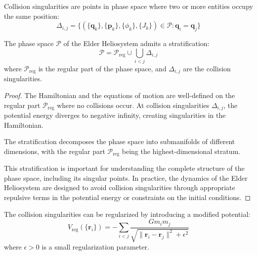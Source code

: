 \begin{definition}
Collision singularities are points in phase space where two or more entities occupy the same position:
\begin{equation}
\Delta_{i,j} = \{(\{\mathbf{q}_k\}, \{\mathbf{p}_k\}, \{\phi_k\}, \{J_k\}) \in \mathcal{P} : \mathbf{q}_i = \mathbf{q}_j\}
\end{equation}
\end{definition}

\begin{theorem}
The phase space $\mathcal{P}$ of the Elder Heliosystem admits a stratification:
\begin{equation}
\mathcal{P} = \mathcal{P}_{\text{reg}} \cup \bigcup_{i < j} \Delta_{i,j}
\end{equation}
where $\mathcal{P}_{\text{reg}}$ is the regular part of the phase space, and $\Delta_{i,j}$ are the collision singularities.
\end{theorem}

\begin{proof}
The Hamiltonian and the equations of motion are well-defined on the regular part $\mathcal{P}_{\text{reg}}$ where no collisions occur. At collision singularities $\Delta_{i,j}$, the potential energy diverges to negative infinity, creating singularities in the Hamiltonian.

The stratification decomposes the phase space into submanifolds of different dimensions, with the regular part $\mathcal{P}_{\text{reg}}$ being the highest-dimensional stratum.

This stratification is important for understanding the complete structure of the phase space, including its singular points. In practice, the dynamics of the Elder Heliosystem are designed to avoid collision singularities through appropriate repulsive terms in the potential energy or constraints on the initial conditions.
\end{proof}

\begin{theorem}
The collision singularities can be regularized by introducing a modified potential:
\begin{equation}
V_{\text{reg}}(\{\mathbf{r}_i\}) = -\sum_{i < j} \frac{G m_i m_j}{\sqrt{\|\mathbf{r}_i - \mathbf{r}_j\|^2 + \epsilon^2}}
\end{equation}
where $\epsilon > 0$ is a small regularization parameter.
\end{theorem}

